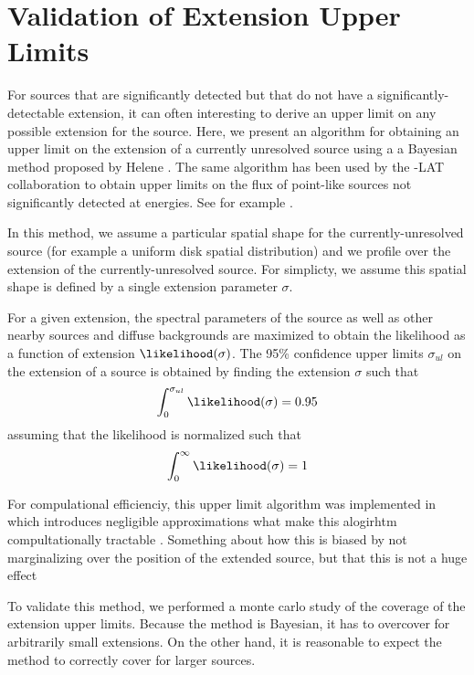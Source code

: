 \section{Validation of Extension Upper Limits}

For sources that are significantly detected but that do not have a
significantly-detectable extension, it can often interesting to derive an
upper limit on any possible extension for the source.  Here, we present
an algorithm for obtaining an upper limit on the extension
of a currently unresolved source using a a Bayesian method proposed by Helene \citep{Helene1983}.
The same algorithm has been used by the \fermi-LAT collaboration to
obtain upper limits on the flux of point-like sources not significantly
detected at \gev energies. See for example \cite{first_cat}.

In this method, we assume a particular spatial shape for
the currently-unresolved source (for example a uniform disk
spatial distribution) and we profile over the extension of the
currently-unresolved source. For simplicty, we assume this spatial shape
is defined by a single extension parameter $\sigma$.

For a given extension, the spectral parameters
of the source as well as other nearby sources and diffuse backgrounds
are maximized to obtain the likelihood as a function of extension $\likelihood(\sigma)$.
The 95\% confidence upper limits $\sigma_{ul}$ on the extension of a source
is obtained by finding the extension $\sigma$ such that
\begin{equation}
  \int_0^{\sigma_{ul}} \likelihood(\sigma) = 0.95
\end{equation}
assuming that the likelihood is normalized such that
\begin{equation}
  \int_0^{\infty} \likelihood(\sigma) = 1
\end{equation}

For compulational efficienciy, this upper limit algorithm was implemented in \pointlike 
which introduces negligible approximations what make this alogirhtm compultationally 
tractable \citep{extended_source_search}.
Something about how this is biased by not marginalizing over the position of the extended source,
but that this is not a huge effect

To validate this method, we performed a monte carlo study of the coverage
of the extension upper limits.  Because the method is Bayesian, it has
to overcover for arbitrarily small extensions.  On the other hand, it
is reasonable to expect the method to correctly cover for larger sources.

